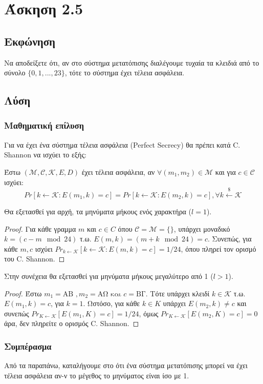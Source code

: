 \section{Άσκηση 2.5}

\subsection{Εκφώνηση}

Να αποδείξετε ότι, αν στο σύστημα μετατόπισης διαλέγουμε τυχαία τα κλειδιά από το σύνολο $\{0, 1, ..., 23\}$, τότε το σύστημα έχει τέλεια ασφάλεια.

\subsection{Λύση} 

\subsubsection{Μαθηματική επίλυση}

Για να έχει ένα σύστημα τέλεια ασφάλεια (Perfect Secrecy) θα πρέπει κατά C. Shannon να ισχύει το εξής: 

\begin{definition}
    Έστω $(\mathcal{M}, \mathcal{C}, \mathcal{K}, E, D)$ έχει τέλεια ασφάλεια, αν $\forall (m_1, m_2) \in \mathcal{M}$ και για $c \in \mathcal{C}$ ισχύει:
    \begin{equation}
        Pr[k \leftarrow \mathcal{K}: E(m_1, k) = c] = Pr[k \leftarrow \mathcal{K}: E(m_2, k) = c], \forall k \stackrel{\$}{\leftarrow} \mathcal{K}
    \end{equation}
\end{definition}

Θα εξετασθεί για αρχή, τα μηνύματα μήκους ενός χαρακτήρα ($l = 1$). 

\begin{proof}
    Για κάθε γραμμα $m$ και $c \in C$ όπου $\mathcal{C} = \mathcal{M} = \{$$\}$, υπάρχει μοναδικό $k = (c - m \mod 24)$ τ.ω. $E(m, k) = (m + k \mod 24) = c$. Συνεπώς, για κάθε $m, c$ ισχύει $Pr_{k \leftarrow \mathcal{K}}[k \leftarrow \mathcal{K}: E(m, k) = c] = 1/24$, όπου πληρεί τον ορισμό του C. Shannon.
\end{proof}

Στην συνέχεια θα εξετασθεί για μηνύματα μήκους μεγαλύτερο από 1 ($l > 1$). 

\begin{proof}
    Έστω $m_1 = \text{ΑΒ }, m_2 = \text{ΑΩ και } c = \text{ΒΓ}$. Τότε υπάρχει κλειδί $k \in \mathcal{K}$ τ.ω. $E(m_1, k) = c$, για $k = 1$. Ωστόσο, για κάθε $k \in K$ υπάρχει $E(m_2, k) \neq c$ και συνεπώς $Pr_{K \leftarrow \mathcal{K}}[E(m_1, K) = c] = 1/24$, όμως $Pr_{K \leftarrow \mathcal{K}}[E(m_2, K) = c] = 0$ άρα, δεν πληρείτε ο ορισμός C. Shannon.
\end{proof}

\subsubsection{Συμπέρασμα}

Από τα παραπάνω, καταλήγουμε στο ότι ένα σύστημα μετατόπισης μπορεί να έχει τέλεια ασφάλεια αν-ν το μέγεθος το μηνύματος είναι ίσο με 1.